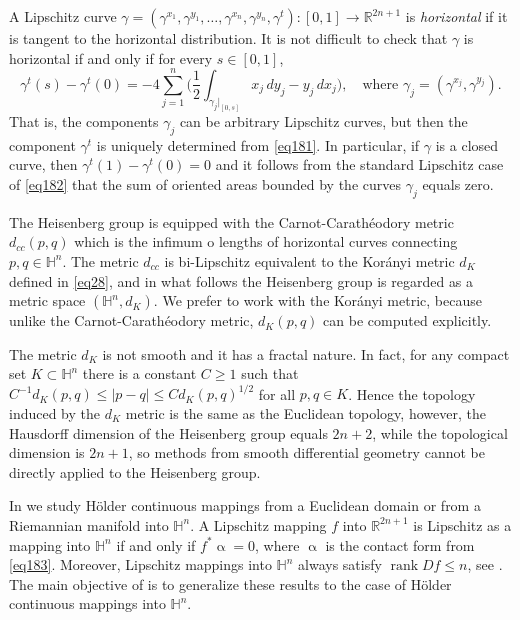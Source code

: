 \documentclass[intlimits,12pt,reqno]{amsart}
\newcommand{\bbbr}{\mathbb R}
\newcommand{\bbbh}{\mathbb H}
\newcommand{\R}{\mathbb R}
\numberwithin{equation}{section}
\theoremstyle{definition}
\def\rank{\operatorname{rank}}
\begin{document}
A Lipschitz curve $\gamma=(\gamma^{x_1},\gamma^{y_1},\ldots,\gamma^{x_n},\gamma^{y_n},\gamma^t):[0,1]\to\bbbr^{2n+1}$ is {\em horizontal} if it is tangent to the horizontal distribution. It is not difficult to check that $\gamma$ is horizontal if and only if for every $s\in [0,1]$,
\begin{equation}
\label{eq181}
\gamma^t(s)-\gamma^t(0)
=
-4\sum_{j=1}^n \Bigg(\frac{1}{2}\int_{\gamma_j|_{[0,s]}} x_j\, dy_j-y_j\, dx_j\Bigg),
\quad
\text{where } \gamma_j=(\gamma^{x_j},\gamma^{y_j}).
\end{equation}
That is, the components $\gamma_j$ can be arbitrary Lipschitz curves, but then the component $\gamma^t$ is uniquely determined from \eqref{eq181}. In particular, if $\gamma$ is a closed curve, then $\gamma^t(1)-\gamma^t(0)=0$ and it follows from the standard Lipschitz case of \eqref{eq182} that the sum of oriented areas bounded by the curves $\gamma_j$ equals zero.

The Heisenberg group is equipped with the Carnot-Carath\'eodory metric $d_{cc}(p,q)$ which is the infimum o lengths of horizontal curves connecting $p,q\in\bbbh^n$. The metric $d_{cc}$ is bi-Lipschitz equivalent to the Kor\'anyi metric $d_K$ defined in \eqref{eq28}, and in what follows the Heisenberg group is regarded as a metric space $(\bbbh^n,d_K)$.
We prefer to work with the Kor\'anyi metric, because unlike the Carnot-Carath\'eodory metric, $d_K(p,q)$ can be computed explicitly.


The metric $d_K$ is not smooth and it has a fractal nature. In fact, for any compact set 
$K\subset\bbbh^n$ there is a constant $C\geq 1$ such that $C^{-1}d_{K}(p,q)\leq |p-q|\leq Cd_{K}(p,q)^{1/2}$
for all $p,q\in K$. Hence the topology induced by the $d_K$
metric is the same as the Euclidean topology, however, the Hausdorff dimension of the 
Heisenberg group equals $2n+2$, while the topological dimension is $2n+1$, so methods from smooth differential geometry cannot be directly applied to the Heisenberg group.

In  we study H\"older continuous mappings from a Euclidean domain or from a Riemannian manifold into $\bbbh^n$. A Lipschitz mapping $f$ into $\R^{2n+1}$ is Lipschitz as a mapping into $\bbbh^n$ if and only if $f^*\upalpha=0$, where $\upalpha$ is the contact form from \eqref{eq183}. Moreover, Lipschitz mappings into $\bbbh^n$ always satisfy $\rank Df\leq n$, see . The main objective of  is to generalize these results to the case of H\"older continuous mappings into $\bbbh^n$.
\end{document}
